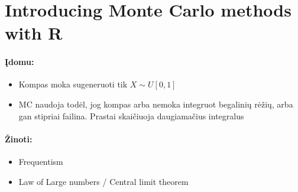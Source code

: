 \documentclass[11pt]{article}
\begin{document}
\section*{Introducing Monte Carlo methods with R}
\paragraph*{ Įdomu:}
\begin{itemize}
\item Kompas moka sugeneruoti tik $X \sim U[0,1]$
\item MC naudoja todėl, jog kompas arba nemoka integruot begalinių rėžių,
arba gan stipriai failina. Prastai skaičiuoja daugiamačius integralus

\end{itemize}

\paragraph*{Žinoti:}
\begin{itemize}
\item Frequentism
\item Law of Large numbers / Central limit theorem
\end{itemize}
\end{document}
